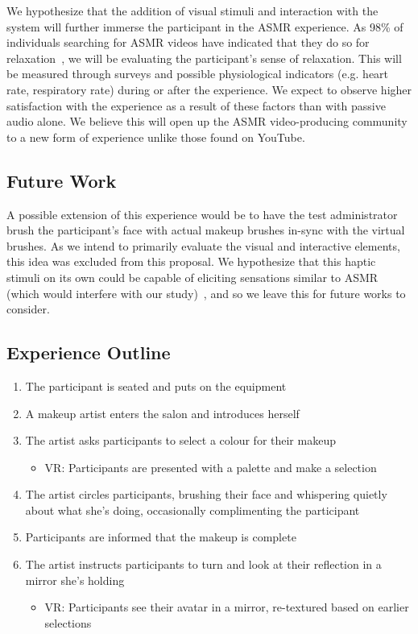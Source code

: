 \documentclass{sigchi}
\begin{document}
We hypothesize that the addition of visual stimuli and interaction with the system will further immerse the participant in the ASMR experience. As 98\% of individuals searching for ASMR videos have indicated that they do so for relaxation~\cite{barratt2015autonomous}, we will be evaluating the participant's sense of relaxation. This will be measured through surveys and possible physiological indicators (e.g. heart rate, respiratory rate) during or after the experience. We expect to observe higher satisfaction with the experience as a result of these factors than with passive audio alone. We believe this will open up the ASMR video-producing community to a new form of experience unlike those found on YouTube.

\subsection{Future Work}

A possible extension of this experience would be to have the test administrator brush the participant's face with actual makeup brushes in-sync with the virtual brushes. As we intend to primarily evaluate the visual and interactive elements, this idea was excluded from this proposal. We hypothesize that this haptic stimuli on its own could be capable of eliciting sensations similar to ASMR (which would interfere with our study)~\cite{hall1897psychology}, and so we leave this for future works to consider.

\subsection{Experience Outline}

\begin{enumerate}
\item{The participant is seated and puts on the equipment}
\item{A makeup artist enters the salon and introduces herself}
\item{The artist asks participants to select a colour for their makeup}
\begin{itemize}
\item{VR: Participants are presented with a palette and make a selection}
\end{itemize}
\item{The artist circles participants, brushing their face and whispering quietly about what she's doing, occasionally complimenting the participant}
\item{Participants are informed that the makeup is complete }
\item{The artist instructs participants to turn and look at their reflection in a mirror she's holding}
\begin{itemize}
\item{VR: Participants see their avatar in a mirror, re-textured based on earlier selections}
\end{itemize}
\end{enumerate}
\end{document}
